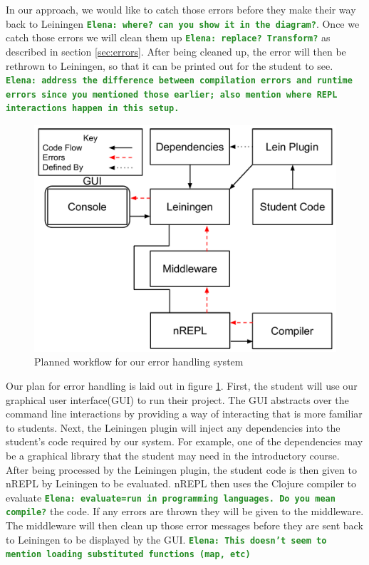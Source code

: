 \documentclass[12pt]{article}
\newcommand{\comment}[1]{{\bf \tt  {#1}}}
\newcommand{\emcomment}[1]{\textcolor{ForestGreen}{\comment{Elena: {#1}}}}
\begin{document}
In our approach, we would like to catch those errors before they make their way back to Leiningen \emcomment{where? can you show it in the diagram?}. Once we catch those errors we will clean them up \emcomment{replace? Transform?} as described in section \ref{sec:errors}. After being cleaned up, the error will then be rethrown to Leiningen, so that it can be printed out for the student to see. \emcomment{address the difference between compilation errors and runtime errors since you mentioned those earlier; also mention where REPL interactions happen in this setup.}

\begin{figure}[h]
 \includegraphics[width=12cm]{OurErrorHandlingSystem.pdf}
 \centering
  \caption{Planned workflow for our error handling system}
 \label{fig:OurSystem}
\end{figure}

Our plan for error handling is laid out in figure \ref{fig:OurSystem}. First, the student will use our graphical user interface(GUI) to run their project. The GUI abstracts over the command line interactions by providing a way of interacting that is more familiar to students. Next, the Leiningen plugin will inject any dependencies into the student's code required by our system. For example, one of the dependencies may be a graphical library that the student may need in the introductory course. After being processed by the Leiningen plugin, the student code is then given to nREPL by Leiningen to be evaluated. nREPL then uses the Clojure compiler to evaluate \emcomment{evaluate=run in programming languages. Do you mean compile?} the code. If any errors are thrown they will be given to the middleware. The middleware will then clean up those error messages before they are sent back to Leiningen to be displayed by the GUI.
\emcomment{This doesn't seem to mention loading substituted functions (map, etc)}
\end{document}
